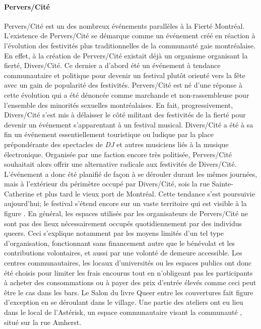 \paragraph{Pervers/Cité}
\label{subsec:perverscite}
Pervers/Cité est un des nombreux événements parallèles à la Fierté Montréal.
L'existence de Pervers/Cité se démarque comme un événement créé en réaction à l'évolution des festivités plus traditionnelles de la communauté gaie montréalaise.
En effet, à la création de Pervers/Cité existait déjà un organisme organisant la fierté, Divers/Cité.
Ce dernier a d'abord été un événement à tendance communautaire et politique pour devenir un festival plutôt orienté vers la fête avec un gain de popularité des festivités.
Pervers/Cité est né d'une réponse à cette évolution qui a été dénoncée comme marchande et non-rassembleuse pour l'ensemble des minorités sexuelles montréalaises.
En fait, progressivement, Divers/Cité s'est mis à délaisser le côté militant des festivités de la fierté pour  devenir un événement s'apparentant à un festival musical.
Divers/Cité a été à sa fin un événement essentiellement touristique ou ludique par la place prépondérante des spectacles de \emph{DJ} et autres musiciens liés à la musique électronique.
Organisée par une faction encore très politisée, Pervers/Cité souhaitait alors offrir une alternative radicale aux festivités de Divers/Cité.
L'événement a donc été planifié de façon à se dérouler durant les mêmes journées, mais à l'extérieur du périmètre occupé par Divers/Cité, sois la rue Sainte-Catherine et plus tard le vieux port de Montréal.
Cette tendance s'est poursuivie aujourd'hui; le festival s'étend encore sur un vaste territoire qui est visible à la figure .
En général, les espaces utilisés par les organisateurs de Pervers/Cité ne sont pas des lieux nécessairement occupés quotidiennement par des individus queers.
Ceci s'explique notamment par les moyens limités d'un tel type d'organisation, fonctionnant sans financement autre que le bénévolat et les contributions volontaires, et aussi par une volonté de demeure accessible.
Les centres communautaires, les locaux d'universités ou les espaces publics ont donc été choisis pour limiter les frais encourus tout en n’obligeant pas les participants à acheter des consommations ou à payer des prix d'entrée élevés comme ceci peut être le cas dans les bars.
Le Salon du livre Queer entre les couvertures fait figure d'exception en se déroulant dans le village.
Une partie des ateliers ont eu lieu dans le local de l'Astérisk, un espace communautaire visant la communauté \lgbt{}, situé sur la rue Amherst.

